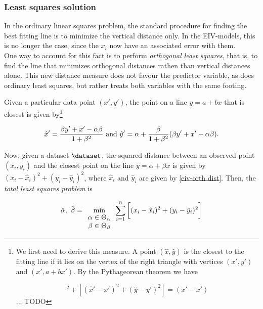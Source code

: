 \documentclass{homework}
\begin{document}
\subsubsection{Least squares solution}

In the ordinary linear squares problem, the standard procedure for finding the best fitting line is to minimize the vertical distance only. In the EIV-models, this is no longer the case, since the $x_i$ now have an associated error with them. \\

One way to account for this fact is to perform \textit{orthogonal least squares}, that is, to find the line that minimizes orthogonal distances rathen than vertical distances alone. This new distance measure does not favour the predictor variable, as does ordinary least squares, but rather treats both variables with the same footing. 

Given a particular data point $(x',y')$, the point on a line $y = a + bx$ that is closest is given by\footnote{We first need to derive this measure. A point $(\hat{x},\hat{y})$ is the closest to the fitting line if it lies on the vertex of the right triangle with vertices $(x', y')$ and $(x', a+bx')$. By the Pythageorean theorem we have

\begin{equation}
    [(\hat{x} - x')^2 + (\hat{y} - (a+bx'))^2]^2 + [(\hat{x}' - x')^2 + (\hat{y} - y')^2] = (x'-x') 
\end{equation}... TODO} 

\begin{align}
    \hat{x}' = \frac{\beta y'+x'-\alpha\beta}{1+\beta ^2} \textnormal{ and } \hat{y}' = \alpha  + \frac{\beta}{1+\beta ^2}(\beta y' + x' - \alpha \beta ).
    \label{eiv-orth dist}
\end{align}

Now, given a dataset $\dataset$, the squared distance between an observed point $(x_i, y_i)$ and the closest point on the line $y = \alpha  + \beta x$ is given by $(x_i - \hat{x}_i)^2+(y_i - \hat{y}_i)^2$, where $\hat{x}_i$ and $\hat{y}_i$ are given by \eqref{eiv-orth dist}. Then, the \textit{total least squares problem} is

\begin{equation}
    \hat{\alpha}, \textnormal{ } \hat{\beta} =  \min_{\begin{array}{c}
        \small{\alpha  \in \Theta_{\alpha}} \\
        \small{\beta  \in \Theta_{\beta}}
    \end{array}}\sum_{i=1}^{n} \bigg[(x_i - \hat{x}_i)^2+(y_i - \hat{y}_i)^2 \bigg]
    \label{eiv-minimization}
\end{equation}
\end{document}
